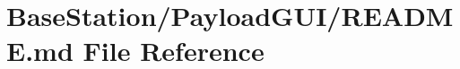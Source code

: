 \hypertarget{BaseStation_2PayloadGUI_2README_8md}{\section{Base\-Station/\-Payload\-G\-U\-I/\-R\-E\-A\-D\-M\-E.md File Reference}
\label{BaseStation_2PayloadGUI_2README_8md}
}
